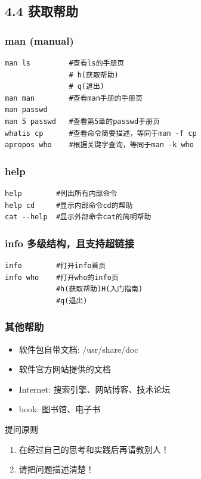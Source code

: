 \documentclass[xcolor=svgnames,presentation]{beamer}
\begin{document}
\subsection{4.4 获取帮助}
\label{sec-4-4}
\begin{frame}[fragile]
\frametitle{man (manual)}
\label{sec-4-4-1}


\begin{verbatim}
man ls         #查看ls的手册页
               # h(获取帮助)
               # q(退出)
man man        #查看man手册的手册页
man passwd
man 5 passwd   #查看第5章的passwd手册页
whatis cp      #查看命令简要描述，等同于man -f cp
apropos who    #根据关键字查询，等同于man -k who
\end{verbatim}
\end{frame}
\begin{frame}[fragile]
\frametitle{help}
\label{sec-4-4-2}


\begin{verbatim}
help        #列出所有内部命令
help cd     #显示内部命令cd的帮助
cat --help  #显示外部命令cat的简明帮助
\end{verbatim}
\end{frame}
\begin{frame}[fragile]
\frametitle{info  多级结构，且支持超链接}
\label{sec-4-4-3}


\begin{verbatim}
info        #打开info首页
info who    #打开who的info页
            #h(获取帮助)H(入门指南)
            #q(退出)
\end{verbatim}
\end{frame}
\begin{frame}
\frametitle{其他帮助}
\label{sec-4-4-4}
\begin{itemize}

\item 软件包自带文档: /usr/share/doc
\label{sec-4-4-4-1}%

\item 软件官方网站提供的文档
\label{sec-4-4-4-2}%

\item Internet: 搜索引擎、网站博客、技术论坛
\label{sec-4-4-4-3}%

\item book: 图书馆、电子书
\label{sec-4-4-4-4}%
\end{itemize} %
\begin{block}{提问原则}
\label{sec-4-4-4-5}

\begin{enumerate}
\item 在经过自己的思考和实践后再请教别人！
\item 请把问题描述清楚！
\end{enumerate}
\end{block}
\end{frame}
\end{document}
